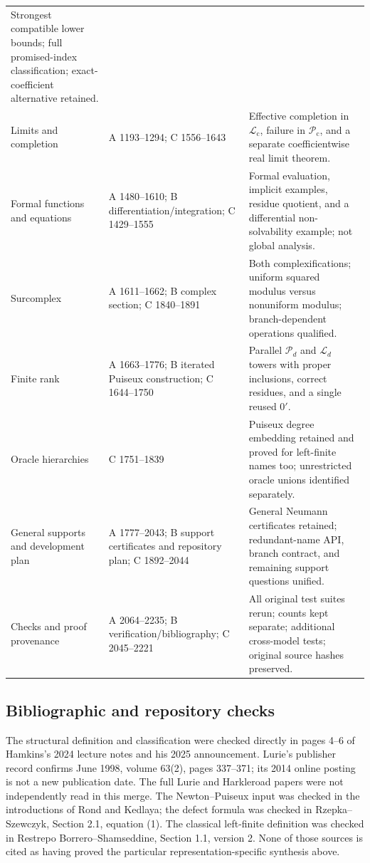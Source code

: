 \documentclass[11pt,letterpaper]{article}
\numberwithin{equation}{section}
\theoremstyle{definition}
\theoremstyle{remark}
\newcommand{\Lc}{\mathcal L_{\mathrm c}}
\newcommand{\Pc}{\mathcal P_{\mathrm c}}
\begin{document}
\begin{longtable}{@{}P{.23\textwidth}P{.25\textwidth}P{.44\textwidth}@{}}
Strongest compatible lower bounds; full promised-index classification; exact-coefficient alternative retained.\\
Limits and completion & A 1193--1294; C 1556--1643 &
Effective completion in $\Lc$, failure in $\Pc$, and a separate coefficientwise real limit theorem.\\
Formal functions and equations & A 1480--1610; B differentiation/integration; C 1429--1555 &
Formal evaluation, implicit examples, residue quotient, and a differential non-solvability example; not global analysis.\\
Surcomplex & A 1611--1662; B complex section; C 1840--1891 &
Both complexifications; uniform squared modulus versus nonuniform modulus; branch-dependent operations qualified.\\
Finite rank & A 1663--1776; B iterated Puiseux construction; C 1644--1750 &
Parallel $\mathcal P_d$ and $\mathcal L_d$ towers with proper inclusions, correct residues, and a single reused $0'$.\\
Oracle hierarchies & C 1751--1839 &
Puiseux degree embedding retained and proved for left-finite names too; unrestricted oracle unions identified separately.\\
General supports and development plan & A 1777--2043; B support certificates and repository plan; C 1892--2044 &
General Neumann certificates retained; redundant-name API, branch contract, and remaining support questions unified.\\
Checks and proof provenance & A 2064--2235; B verification/bibliography; C 2045--2221 &
All original test suites rerun; counts kept separate; additional cross-model tests; original source hashes preserved.\\
\bottomrule
\end{longtable}
\normalsize

\subsection{Bibliographic and repository checks}
The structural definition and classification were checked directly in pages
4--6 of Hamkins's 2024 lecture notes and his 2025 announcement. Lurie's
publisher record confirms June 1998, volume 63(2), pages 337--371; its 2014
online posting is not a new publication date. The full Lurie and Harkleroad
papers were not independently read in this merge. The Newton--Puiseux input
was checked in the introductions of Rond and Kedlaya; the defect formula
was checked in Rzepka--Szewczyk, Section 2.1, equation (1). The classical
left-finite definition was checked in Restrepo Borrero--Shamseddine,
Section 1.1, version 2. None of those sources is cited as having proved the
particular representation-specific synthesis above.
\end{document}
